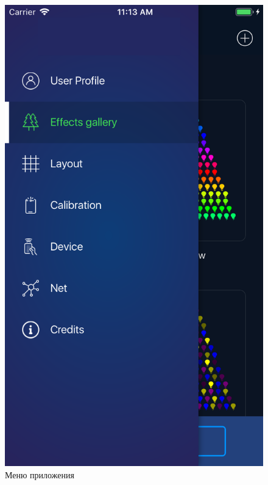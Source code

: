 \begin{figure}[H]
\centering
	\includegraphics[scale=0.2]{figures/userGuide/sideMenu.png}
	\caption{Меню приложения}
	\label{fig:develop:userGuide:sideMenu}
\end{figure}
~
